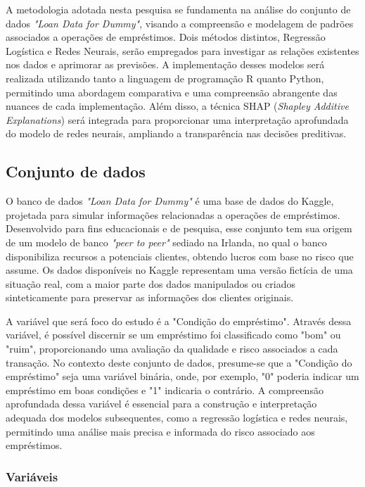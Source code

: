 A metodologia adotada nesta pesquisa se fundamenta na análise do conjunto de dados \textit{"Loan Data for Dummy"}, 
visando a compreensão e modelagem de padrões associados a operações de empréstimos. Dois métodos distintos, 
Regressão Logística e Redes Neurais, serão empregados para investigar as relações existentes nos dados e aprimorar as previsões.
A implementação desses modelos será realizada utilizando tanto a linguagem de programação R quanto Python,
permitindo uma abordagem comparativa e uma compreensão abrangente das nuances de cada implementação.
Além disso, a técnica SHAP (\textit{Shapley Additive Explanations}) será integrada para proporcionar
uma interpretação aprofundada do modelo de redes neurais, ampliando a transparência nas decisões preditivas. 



\subsection{Conjunto de dados}

O banco de dados \textit{"Loan Data for Dummy"} é uma base de dados do Kaggle, projetada para simular informações relacionadas 
a operações de empréstimos. Desenvolvido para fins educacionais e de pesquisa, esse conjunto tem sua origem de um modelo de 
banco \textit{"peer to peer"} sediado na Irlanda, no qual o banco disponibiliza recursos a potenciais clientes, 
obtendo lucros com base no risco que assume. 
Os dados disponíveis no Kaggle representam uma versão fictícia de uma situação real, com a maior parte dos dados manipulados
ou criados sinteticamente para preservar as informações dos clientes originais.

A variável que será foco do estudo é a "Condição do empréstimo". Através dessa variável, é 
possível discernir se um empréstimo foi classificado como "bom" ou "ruim", proporcionando uma avaliação da qualidade e 
risco associados a cada transação. No contexto deste conjunto de dados, presume-se que a "Condição do empréstimo" seja uma variável binária,
onde, por exemplo, "0" poderia indicar um empréstimo em boas condições e "1" indicaria o contrário.
A compreensão aprofundada dessa variável é essencial para a construção e interpretação adequada dos modelos subsequentes, 
como a regressão logística e redes neurais, permitindo uma análise mais precisa e informada do risco associado aos empréstimos.

\subsubsection{Variáveis}

